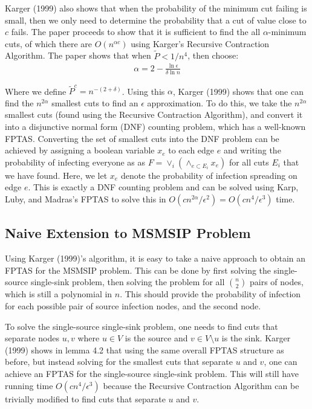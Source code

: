 \documentclass{article}
\theoremstyle{plain}
\begin{document}
Karger (1999) also shows that when the probability of the minimum cut failing is small, then we only need to determine the probability that a cut of value close to $c$ fails. The paper proceeds to show that it is sufficient to find the all $\alpha$-minimum cuts, of which there are $O(n^{\alpha c})$ using Karger's Recursive Contraction Algorithm. The paper shows that when $\tilde{P} < 1/n^4$, then choose:
\begin{eqnarray}
  \alpha = 2 - \frac{\ln \epsilon}{\delta \ln n}
\end{eqnarray}

Where we define $\tilde{P}^c = n^{-(2 + \delta)}$. Using this $\alpha$, Karger (1999) shows that one can find the $n^{2 \alpha}$ smallest cuts to find an $\epsilon$ approximation. To do this, we take the $n^{2 \alpha}$ smallest cuts (found using the Recursive Contraction Algorithm), and convert it into a disjunctive normal form (DNF) counting problem, which has a well-known FPTAS. Converting the set of smallest cuts into the DNF problem can be achieved by assigning a boolean variable $x_e$ to each edge $e$ and writing the probability of infecting everyone as as $F = \vee_i (\wedge_{e \subset E_i} x_e)$ for all cuts $E_i$ that we have found. Here, we let $x_e$ denote the probability of infection spreading on edge $e$. This is exactly a DNF counting problem and can be solved using Karp, Luby, and Madras's FPTAS to solve this in $O(c n^{2 \alpha} / \epsilon^2) = O(c n^4 / \epsilon^3)$ time.

\subsection{Naive Extension to MSMSIP Problem}

Using Karger (1999)'s algorithm, it is easy to take a naive approach to obtain an FPTAS for the MSMSIP problem. This can be done by first solving the single-source single-sink problem, then solving the problem for all ${n \choose 2}$ pairs of nodes, which is still a polynomial in $n$. This should provide the probability of infection for each possible pair of source infection nodes, and the second node.

To solve the single-source single-sink problem, one needs to find cuts that separate nodes $u,v$ where $u \in V$ is the source and $v \in V \setminus u$ is the sink. Karger (1999) shows in lemma 4.2 that using the same overall FPTAS structure as before, but instead solving for the smallest cuts that separate $u$ and $v$, one can achieve an FPTAS for the single-source single-sink problem. This will still have running time $O(c n^4 / \epsilon^3)$ because the Recursive Contraction Algorithm can be trivially modified to find cuts that separate $u$ and $v$.
\end{document}
